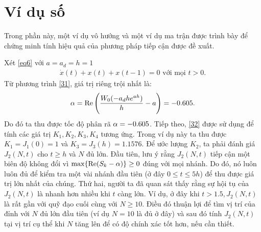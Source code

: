 \section{Ví dụ số}\label{viduso}
Trong phần này, một ví dụ vô hướng và một ví dụ ma trận được trình bày để chứng minh tính hiệu quả của phương pháp tiếp cận được đề xuất.
\begin{vd}\label{vd1}
	Xét \eqref{eq6} với $a = a_d = h =1$
	\begin{align}\label{39}
		\dot{x}(t) +x(t) + x(t-1) = 0 \mbox{ với mọi } t>0.
	\end{align}
	Từ phương trình \eqref{31}, giá trị riêng trội nhất là:
	\begin{align}\label{40}
		\alpha = \mathrm{Re} \left( \dfrac{W_0(-a_dhe^{ah})}{h} -a \right) = -0.605.
	\end{align}
Do đó ta thu được tốc độ phân rã $\alpha= -0.605$. Tiếp theo, \eqref{32} được sử dụng để tính các giá trị $K_1, K_2,K_3,K_4$ tương ứng. 
Trong ví dụ này ta thu được $K_1 = J_1(0)=1$ và $K_3= J_3(h) = 1.1576$. Để ước lượng $K_2$, ta phải đánh giá $J_2(N,t)$ cho $t \ge h$ và $N$ đủ lớn. Đầu tiên, lưu ý rằng $J_2(N,t)$ tiếp cận một biên độ không đổi vì $\max\{ \mathrm{Re}(S_k-\alpha) \} \ge 0$ đúng với mọi nhánh. Do đó, nó luôn luôn đủ để kiểm tra một vài nhánh đầu tiên (ở đây $0 \le t \le 5h$) để thu được giá trị lớn nhất của chúng. Thứ hai, người ta đã quan sát thấy rằng sự hội tụ của $J_2(N,t)$ là nhanh hơn nhiều khi $t$ càng lớn. Ví dụ, ở đây khi $t > 1.5, J_2(N,t)$ là rất gần với quỹ đạo cuối cùng với $ N \ge 10$. Điều đó thuận lợi để tìm vị trí của đỉnh với $N$ đủ lớn đầu tiên (ví dụ $N =10$ là đủ ở đây) và sau đó tính $J_2(N,t)$ tại vị trí cụ thể khi $N$ tăng lên để có độ chính xác tốt hơn, nếu cần thiết.


\end{vd}
